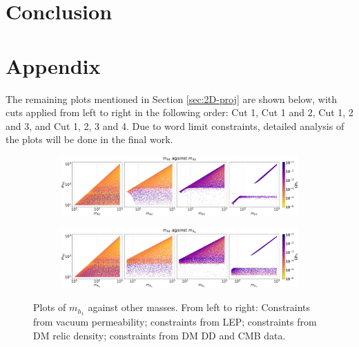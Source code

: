 \documentclass[12pt]{article}
\begin{document}
\section{Conclusion}
\label{sec:conclusion}

\onecolumn
\newpage



\newpage
\onecolumn
\appendix

\section{Appendix}
\label{sec:Appendix}
The remaining plots mentioned in Section \ref{sec:2D-proj} are shown below, with cuts applied from left to right in the following order: Cut 1, Cut 1 and 2, Cut 1, 2 and 3, and Cut 1, 2, 3 and 4. Due to word limit constraints, detailed analysis of the plots will be done in the final work.
\begin{figure}[H]
    \begin{subfigure}[b]{\columnwidth}
      \centering
      \includegraphics[width=1\columnwidth]{4plot/MD1_MD2.pdf}
    \end{subfigure}

    \begin{subfigure}[b]{\columnwidth}
      \centering
      \includegraphics[width=1\columnwidth]{4plot/MD1_MDP.pdf}
    \end{subfigure}
    \caption{Plots of $m_{h_1}$ against other masses. From left to right: Constraints from vacuum permeability; constraints from LEP; constraints from DM relic density; constraints from DM DD and CMB data.}
\end{figure}
\end{document}
